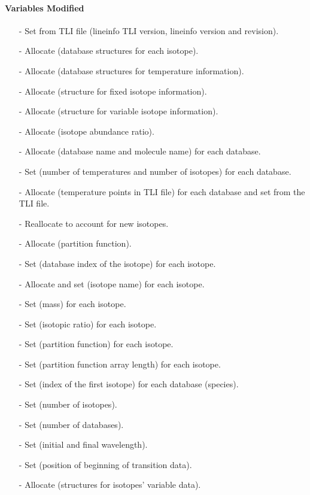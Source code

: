 \documentclass[letterpaper,12pt]{article}
\begin{document}
\paragraph{Variables Modified}
\begin{enumerate}[leftmargin=10pt, noitemsep, parsep=0pt, topsep=0ex]
\item[-] Set  from TLI file (lineinfo TLI version, lineinfo
  version and revision).
\item[-] Allocate  (database structures for each isotope).
\item[-] Allocate  (database structures for temperature information).
\item[-] Allocate  (structure for fixed isotope information).
\item[-] Allocate  (structure for variable isotope information).
\item[-] Allocate  (isotope abundance ratio).
\item[-] Allocate  (database name and molecule name) for each database.
\item[-] Set  (number of temperatures and number of isotopes) for each database.
\item[-] Allocate  (temperature points in TLI file) for each database and set from the TLI file.
\item[-] Reallocate  to account for new isotopes.
\item[-] Allocate  (partition function).
\item[-] Set  (database index of the isotope) for each isotope.
\item[-] Allocate and set  (isotope name) for each isotope.
\item[-] Set  (mass) for each isotope.
\item[-] Set  (isotopic ratio) for each isotope.
\item[-] Set  (partition function) for each isotope.
\item[-] Set  (partition function array length) for each isotope.
\item[-] Set  (index of the first isotope) for each database (species).
\item[-] Set  (number of isotopes).
\item[-] Set  (number of databases).
\item[-] Set  (initial and final wavelength).
\item[-] Set  (position of beginning of transition data).
\item[-] Allocate  (structures for isotopes' variable data).
\end{enumerate}
\end{document}
